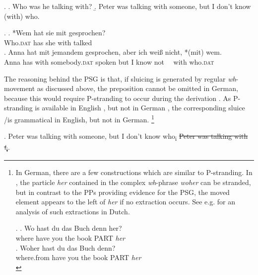 \ex.
\a. Who was he talking with? \label{pst-english-question}\hfill \citep[666]{merchant2004}
\b. Peter was talking with someone, but I don’t know (with) who.

\ex. 
\ag. *Wem hat sie mit gesprochen?\label{ex:pst-german-q}\\
Who.\textsc{dat} has she with talked\\
\bg. Anna hat mit jemandem gesprochen, aber ich wei\ss {} nicht, *(mit) wem. \hfill\\
Anna has with somebody.\textsc{dat} spoken but I know not \mbox{~~}with who.\textsc{dat}\\

\newpage
\noindent The reasoning behind the PSG is that, if sluicing is generated by regular \textit{wh}-movement as discussed above, the preposition cannot be omitted in German, because this would require P-stranding to occur during the derivation \Next. As P-stranding is available in English \LLast[a], but not in German \Last[a], the corresponding sluice \LLast[b]/\Last[b] is grammatical in English, but not in German.%
%
\footnote{In German, there are a few constructions which are similar to P-stranding. In \Next, the particle \textit{her} contained in the complex \textit{wh}-phrase \textit{woher} can be stranded, but in contrast to the PPs providing evidence for the PSG, the moved element appears to the left of \textit{her} if no extraction occurs. See e.g. \citet{vanriemsdijk1978} for an analysis of such extractions in Dutch.

\ex. \ag. Wo hast du das Buch denn her?\\
	  where have you the book PART \textit{her}\\ 
\bg. Woher hast du das Buch denn?\\
	  where.from have you the book PART \textit{her}\\ 

}\afterfn%
%

\ex. Peter was talking with someone, but I don't know who\textsubscript{i} \sout{Peter was talking with \textit{t}\textsubscript{i}}.

